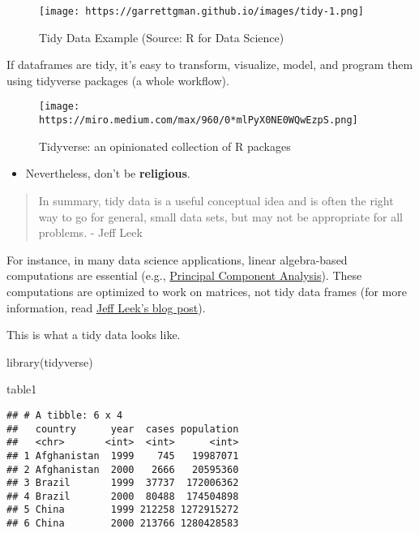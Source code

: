\documentclass[
]{book}
\newenvironment{Shaded}{\begin{snugshade}}{\end{snugshade}}
\newcommand{\FunctionTok}[1]{\textcolor[rgb]{0.00,0.00,0.00}{#1}}
\newcommand{\NormalTok}[1]{#1}
\providecommand{\tightlist}{%
  \setlength{\itemsep}{0pt}\setlength{\parskip}{0pt}}
\begin{document}
\begin{figure}
\centering
\texttt{[image: https://garrettgman.github.io/images/tidy-1.png]}
\caption{Tidy Data Example (Source: R for Data Science)}
\end{figure}

If dataframes are tidy, it's easy to transform, visualize, model, and program them using tidyverse packages (a whole workflow).

\begin{figure}
\centering
\texttt{[image: https://miro.medium.com/max/960/0*mlPyX0NE0WQwEzpS.png]}
\caption{Tidyverse: an opinionated collection of R packages}
\end{figure}

\begin{itemize}
\tightlist
\item
  Nevertheless, don't be \textbf{religious}.
\end{itemize}

\begin{quote}
In summary, tidy data is a useful conceptual idea and is often the right way to go for general, small data sets, but may not be appropriate for all problems. - Jeff Leek
\end{quote}

For instance, in many data science applications, linear algebra-based computations are essential (e.g., \href{https://www.math.upenn.edu/~kazdan/312S13/JJ/PCA-JJ.pdf}{Principal Component Analysis}). These computations are optimized to work on matrices, not tidy data frames (for more information, read \href{https://simplystatistics.org/2016/02/17/non-tidy-data/}{Jeff Leek's blog post}).

This is what a tidy data looks like.

\begin{Shaded}
\begin{Highlighting}[]
\FunctionTok{library}\NormalTok{(tidyverse)}

\NormalTok{table1}
\end{Highlighting}
\end{Shaded}

\begin{verbatim}
## # A tibble: 6 x 4
##   country      year  cases population
##   <chr>       <int>  <int>      <int>
## 1 Afghanistan  1999    745   19987071
## 2 Afghanistan  2000   2666   20595360
## 3 Brazil       1999  37737  172006362
## 4 Brazil       2000  80488  174504898
## 5 China        1999 212258 1272915272
## 6 China        2000 213766 1280428583
\end{verbatim}
\end{document}
